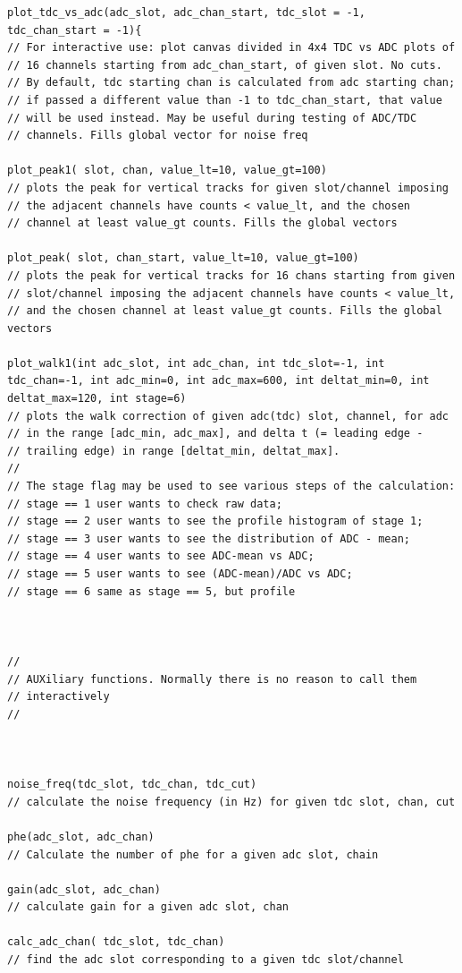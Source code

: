 \documentclass{article}
\begin{document}
\begin{verbatim}
plot_tdc_vs_adc(adc_slot, adc_chan_start, tdc_slot = -1, tdc_chan_start = -1){
// For interactive use: plot canvas divided in 4x4 TDC vs ADC plots of
// 16 channels starting from adc_chan_start, of given slot. No cuts.
// By default, tdc starting chan is calculated from adc starting chan;
// if passed a different value than -1 to tdc_chan_start, that value
// will be used instead. May be useful during testing of ADC/TDC
// channels. Fills global vector for noise freq

plot_peak1( slot, chan, value_lt=10, value_gt=100)
// plots the peak for vertical tracks for given slot/channel imposing
// the adjacent channels have counts < value_lt, and the chosen
// channel at least value_gt counts. Fills the global vectors

plot_peak( slot, chan_start, value_lt=10, value_gt=100)
// plots the peak for vertical tracks for 16 chans starting from given
// slot/channel imposing the adjacent channels have counts < value_lt,
// and the chosen channel at least value_gt counts. Fills the global vectors

plot_walk1(int adc_slot, int adc_chan, int tdc_slot=-1, int tdc_chan=-1, int adc_min=0, int adc_max=600, int deltat_min=0, int deltat_max=120, int stage=6)
// plots the walk correction of given adc(tdc) slot, channel, for adc
// in the range [adc_min, adc_max], and delta t (= leading edge -
// trailing edge) in range [deltat_min, deltat_max].
//
// The stage flag may be used to see various steps of the calculation:
// stage == 1 user wants to check raw data;
// stage == 2 user wants to see the profile histogram of stage 1;
// stage == 3 user wants to see the distribution of ADC - mean;
// stage == 4 user wants to see ADC-mean vs ADC;
// stage == 5 user wants to see (ADC-mean)/ADC vs ADC;
// stage == 6 same as stage == 5, but profile



//
// AUXiliary functions. Normally there is no reason to call them
// interactively
//



noise_freq(tdc_slot, tdc_chan, tdc_cut)
// calculate the noise frequency (in Hz) for given tdc slot, chan, cut

phe(adc_slot, adc_chan)
// Calculate the number of phe for a given adc slot, chain

gain(adc_slot, adc_chan)
// calculate gain for a given adc slot, chan

calc_adc_chan( tdc_slot, tdc_chan)
// find the adc slot corresponding to a given tdc slot/channel


\end{verbatim}
\end{document}
